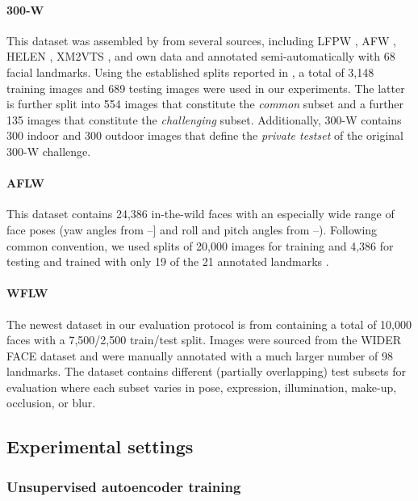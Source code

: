 \documentclass[10pt,twocolumn,letterpaper]{article}
\begin{document}
\vspace{-0.3cm}\paragraph{300-W} This dataset was assembled by \cite{Sagonas2016} from several sources, including LFPW \cite{belhumeur2013localizing}, AFW \cite{le2012interactive}, HELEN \cite{zhu2012face}, XM2VTS \cite{messer1999xm2vtsdb}, and own data and annotated semi-automatically with 68 facial landmarks. Using the established splits reported in \cite{ren2016face}, a total of 3,148 training images 
and 689 testing images were used in our experiments. The latter is further split into 554 images that constitute the {\em common} subset and a further 135 images that constitute the {\em challenging } subset. Additionally, 300-W contains 300 indoor and 300 outdoor images that define the {\em private testset} of the original 300-W challenge.

\vspace{-0.3cm}\paragraph{AFLW} This dataset \cite{koestinger2011annotated} contains 24,386 in-the-wild faces with an especially wide range of face poses (yaw angles from --] and roll and pitch angles from --). Following common convention, we used splits of 20,000 images for training and 4,386 for testing and trained with only 19 of the 21 annotated landmarks \cite{Lv2017}.

\vspace{-0.3cm}\paragraph{WFLW} The newest dataset in our evaluation protocol is from \cite{Wu2018} containing a total of 10,000 faces with a 7,500/2,500 train/test split. Images were sourced from the WIDER FACE dataset \cite{yang2017learning} and were manually annotated with a much larger number of 98 landmarks. The dataset contains different (partially overlapping) test subsets for evaluation where each subset varies in pose, expression, illumination, make-up, occlusion, or blur. 

\subsection{Experimental settings}

\subsubsection{Unsupervised autoencoder training}
\end{document}
